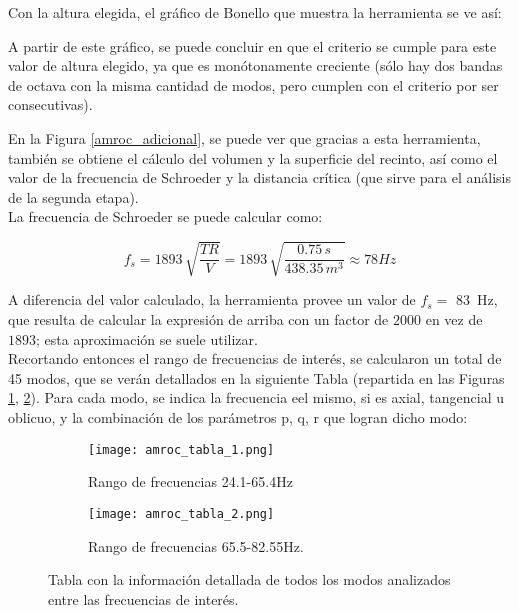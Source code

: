 Con la altura elegida, el gráfico de Bonello que muestra la herramienta se ve así:


A partir de este gráfico, se puede concluir en que el criterio se cumple para este valor de altura elegido, ya que es monótonamente creciente (sólo hay dos bandas de octava con la misma cantidad de modos, pero cumplen con el criterio por ser consecutivas).


En la Figura \ref{amroc_adicional}, se puede ver que gracias a esta herramienta, también se obtiene el cálculo del volumen y la superficie del recinto, así como el valor de la frecuencia de Schroeder y la distancia crítica (que sirve para el análisis de la segunda etapa).\\

La frecuencia de Schroeder se puede calcular como:

\begin{equation}
	f_s = 1893\,\sqrt{\frac{TR}{V}} = 1893\,\sqrt{\frac{0.75\,s}{438.35\,m^3}} \approx 78 Hz
\end{equation}

	A diferencia del valor calculado, la herramienta provee un valor de $f_s =$ \SI{83}{\Hz}, que resulta de calcular la expresión de arriba con un factor de $2000$ en vez de $1893$; esta aproximación se suele utilizar.\\

	Recortando entonces el rango de frecuencias de interés, se calcularon un total de 45 modos, que se verán detallados en la siguiente Tabla (repartida en las Figuras \ref{amroc_tabla_1}, \ref{amroc_tabla_2}). Para cada modo, se indica la frecuencia eel mismo, si es axial, tangencial u oblicuo, y la combinación de los parámetros p, q, r que logran dicho modo:
	
	\begin{figure}[H]
		\centering
		\begin{subfigure}{.5\textwidth}
  			\centering
  			\texttt{[image: amroc\_tabla\_1.png]}
  			\caption{Rango de frecuencias 24.1-65.4Hz}
  			\label{amroc_tabla_1}
		\end{subfigure}%
		\begin{subfigure}{.5\textwidth}
  			\centering
  			\texttt{[image: amroc\_tabla\_2.png]}
  			\caption{Rango de frecuencias 65.5-82.55Hz.}
  			\label{amroc_tabla_2}
		\end{subfigure}
		\caption{Tabla con la información detallada de todos los modos analizados entre las frecuencias de interés.}
		\label{amroc_tablas}
	\end{figure}

